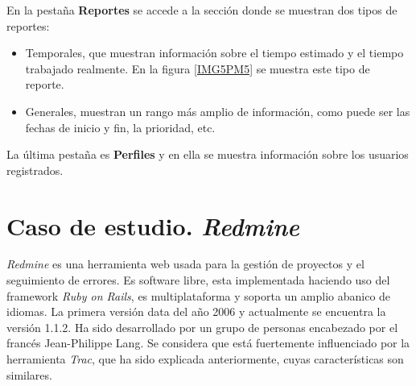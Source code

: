 \documentclass[11pt,a4paper,spanish,twoside]{report}
\begin{document}

        En la pestaña \textbf{Reportes} se accede a la sección donde se
        muestran dos tipos de reportes: 
        \begin{itemize}
          \item Temporales, que muestran información sobre el tiempo estimado
            y el tiempo trabajado realmente. En la figura \ref{IMG5PM5} se
            muestra este tipo de reporte.


          \item Generales, muestran un rango más amplio de información, como
            puede ser las fechas de inicio y fin, la prioridad, etc.
        \end{itemize}

        La última pestaña es \textbf{Perfiles} y en ella se muestra
        información sobre los usuarios registrados.
        

\chapter{Caso de estudio. \emph{Redmine}}

\emph{Redmine} es una herramienta web usada para la gestión de proyectos y el
seguimiento de errores. Es software libre, esta implementada haciendo uso
del framework \emph{Ruby on Rails}, es multiplataforma y soporta un amplio
abanico de idiomas. La primera versión data del año 2006 y actualmente se
encuentra la versión 1.1.2. Ha sido desarrollado por un grupo de personas
encabezado por el francés Jean-Philippe Lang. Se considera que está
fuertemente influenciado por la herramienta \emph{Trac}, que ha sido
explicada anteriormente, cuyas características son similares.
\end{document}
